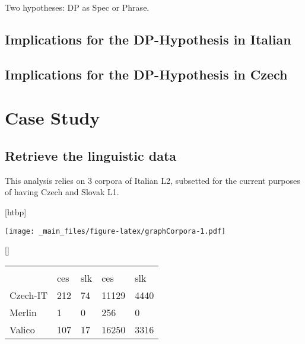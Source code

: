 \documentclass[a4paper,twoside,12pt,chapterprefix=false,listof=flat]{scrartcl}
\makeatletter
\def\fps@figure{htbp}
\renewenvironment{figure}[1][\fps@figure]{
  \edef\@tempa{\noexpand\@float{figure}[#1]} 
  \@tempa
  \sffamily
}{
  \end@float
}
\renewenvironment{table}[1][\fps@table]{
  \edef\@tempa{\noexpand\@float{table}[#1]} 
  \@tempa
  \sffamily
  \footnotesize
}{
  \end@float
}
\theoremstyle{plain} %
\theoremstyle{definition}
\theoremstyle{remark}
\makeatother
\begin{document}
Two hypotheses: DP as Spec or Phrase.

\subsection{Implications for the DP-Hypothesis in
Italian}\label{implications-for-the-dp-hypothesis-in-italian}

\subsection{Implications for the DP-Hypothesis in
Czech}\label{implications-for-the-dp-hypothesis-in-czech}

\section{Case Study}\label{sec:caseStudy}

\subsection{Retrieve the linguistic
data}\label{retrieve-the-linguistic-data}

This analysis relies on 3 corpora of Italian L2, subsetted for the
current purposes of having Czech and Slovak L1.

\begin{figure}
\centering
\texttt{[image: \_main\_files/figure-latex/graphCorpora-1.pdf]}
\caption{\label{fig:graphCorpora}Number of texts by different Corpora}
\end{figure}

\begin{table}

\caption{\label{tab:unnamed-chunk-5}Amount of data in the collection}
\centering
\begin{tabu} to 
\toprule
{} &  &  \\
\cmidrule(l{2pt}r{2pt}){2-3} \cmidrule(l{2pt}r{2pt}){4-5}
  & ces & slk & ces & slk\\
\midrule
Czech-IT & 212 & 74 & 11129 & 4440\\
Merlin & 1 & 0 & 256 & 0\\
Valico & 107 & 17 & 16250 & 3316\\
\bottomrule
\end{tabu}
\end{table}
\end{document}
